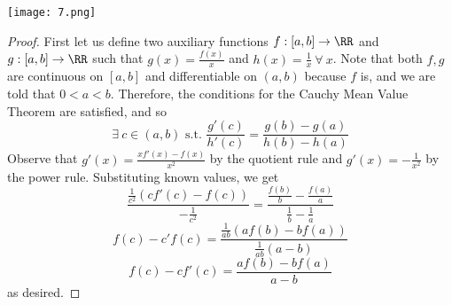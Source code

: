 \documentclass[12pt]{scrartcl}
\begin{document}
\newpage

\texttt{[image: 7.png]}

\begin{proof}
  
\hfill

First let us define two auxiliary functions $f: [a,b] \to \RR$ and $g: [a,b] \to \RR$ such that 
$g(x) = \frac{f(x)}{x}$ and $h(x) = \frac{1}{x} \ \forall \ x$. Note that both $f, g$ are continuous 
on $[a,b]$ and differentiable on $(a,b)$ because $f$ is, and we are told that $0 < a < b$. Therefore, 
the conditions for the Cauchy Mean Value Theorem are satisfied, and so 
\[\exists \ c \in (a,b) \text{ s.t. } \frac{g'(c)}{h'(c)} = \frac{g(b) - g(a)}{h(b) - h(a)}\]
Observe that $g'(x) = \frac{xf'(x) - f(x)}{x^2}$ by the quotient rule and $g'(x) = -\frac{1}{x^2}$ by the 
power rule. Substituting known values, we get 
\[\frac{\frac{1}{c^2} (cf'(c) - f(c))}{-\frac{1}{c^2}} = \frac{\frac{f(b)}{b} - \frac{f(a)}{a}}{\frac{1}{b} - \frac{1}{a}}\]
\[f(c) - c'f(c) = \frac{\frac{1}{ab} (af(b) - bf(a))}{\frac{1}{ab}(a-b)}\]
\[f(c) - cf'(c) = \frac{af(b) - bf(a)}{a - b}\]
as desired.

\end{proof}

\newpage
\end{document}
